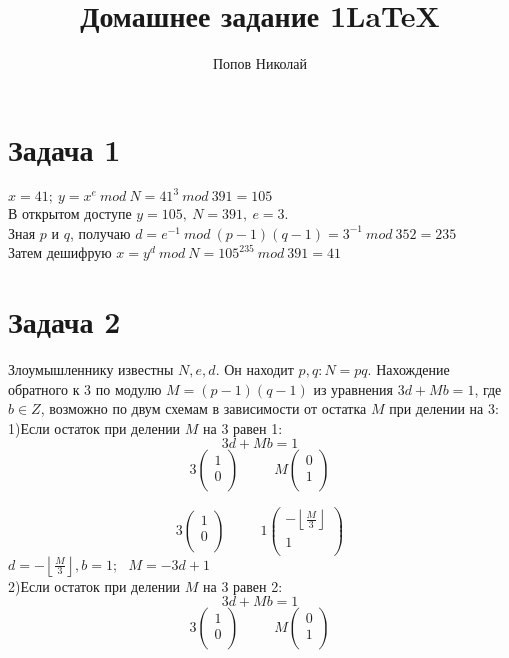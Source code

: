 \documentclass[a4paper,12pt]{article} %
\author{Попов Николай}
\title{Домашнее задание 1\LaTeX{}}
\begin{document}
\section*{Задача 1}

$
x=41; ~y = x^e~ mod~ N  = 41^3 ~mod~391 = 105
$\\
В открытом доступе $y = 105,~ N = 391,~ e = 3$.\\
Зная $p$ и $q$, получаю 
$
d = e^{-1} ~mod~ (p-1)(q-1) = 3^{-1}~mod~352 = 235
$\\
Затем дешифрую $x = y^d~mod~N = 105^{235}~mod~391 = 41 $

\section*{Задача 2}

Злоумышленнику известны $N, e, d$. Он находит $p,q : N = pq$. Нахождение обратного к $3$ по модулю $M = (p-1)(q-1)$ из уравнения $3d+Mb = 1$, где $b \in Z$, возможно по двум схемам в зависимости от остатка $M$ при делении на $3$:\\

1)Если остаток при делении $M$ на 3 равен 1:
\[3d+Mb = 1\]
\[
3\begin{pmatrix}
1\\0\\
\end{pmatrix}\hspace{30pt}
M\begin{pmatrix}
0\\1\\
\end{pmatrix}
\]   

\[
3\begin{pmatrix}
1\\0\\
\end{pmatrix}\hspace{30pt}
1\begin{pmatrix}
-\left\lfloor\frac{M}{3}\right\rfloor\\1\\
\end{pmatrix}
\]  
$d = -\left\lfloor\frac{M}{3}\right\rfloor, b = 1;~~~ M=-3d+1$\\

2)Если остаток при делении $M$ на 3 равен 2:
\[3d+Mb = 1\]
\[
3\begin{pmatrix}
1\\0\\
\end{pmatrix}\hspace{30pt}
M\begin{pmatrix}
0\\1\\
\end{pmatrix}
\]   
\end{document}
